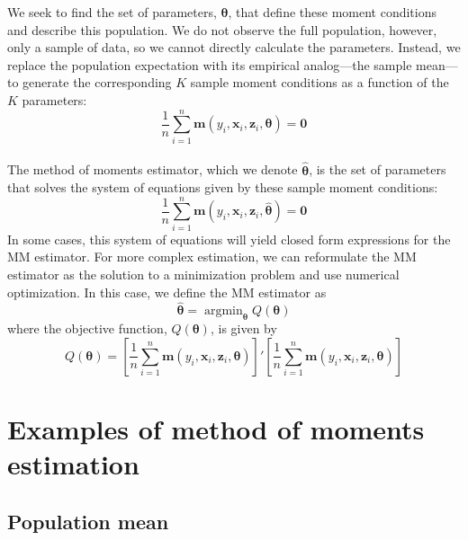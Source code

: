 \documentclass[11pt,letterpaper]{article}
\DeclareMathOperator*{\argmin}{argmin}
\begin{document}
\noindent We seek to find the set of parameters, $\bm{\theta}$, that define these moment conditions and describe this population. We do not observe the full population, however, only a sample of data, so we cannot directly calculate the parameters. Instead, we replace the population expectation with its empirical analog---the sample mean---to generate the corresponding $K$ sample moment conditions as a function of the $K$ parameters:
$$\frac{1}{n} \sum_{i = 1}^n \bm{m}(y_i, \bm{x}_i, \bm{z}_i, \bm{\theta}) = \bm{0}$$ \\

\noindent The method of moments estimator, which we denote $\widehat{\bm{\theta}}$, is the set of parameters that solves the system of equations given by these sample moment conditions:
$$\frac{1}{n} \sum_{i = 1}^n \bm{m}(y_i, \bm{x}_i, \bm{z}_i, \widehat{\bm{\theta}}) = \bm{0}$$
In some cases, this system of equations will yield closed form expressions for the MM estimator. For more complex estimation, we can reformulate the MM estimator as the solution to a minimization problem and use numerical optimization. In this case, we define the MM estimator as
$$\widehat{\bm{\theta}} = \argmin_{\bm{\theta}} Q(\bm{\theta})$$
where the objective function, $Q(\bm{\theta})$, is given by
$$Q(\bm{\theta}) = \left[ \frac{1}{n} \sum_{i = 1}^n \bm{m}(y_i, \bm{x}_i, \bm{z}_i, \bm{\theta}) \right]' \left[ \frac{1}{n} \sum_{i = 1}^n \bm{m}(y_i, \bm{x}_i, \bm{z}_i, \bm{\theta}) \right]$$

\section{Examples of method of moments estimation}

\subsection{Population mean}
\end{document}
